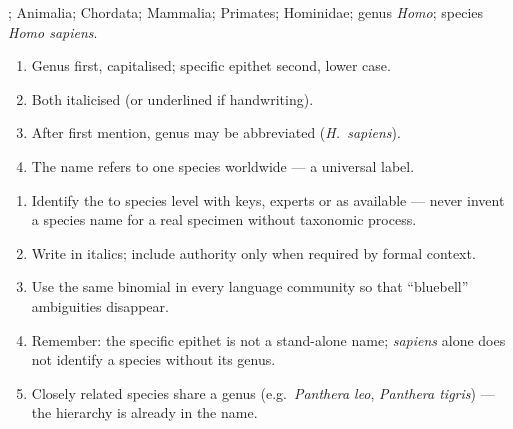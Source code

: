 \begin{example}\label{ex:g10:biodiversity-classification:human}
 ;  Animalia;  Chordata;  Mammalia; 
Primates;  Hominidae; genus \emph{Homo}; species \emph{Homo
sapiens}.
\end{example}

\begin{method}\label{met:g10:biodiversity-classification:name}
\begin{enumerate}
  \item Genus first, capitalised; specific epithet second, lower case.
  \item Both italicised (or underlined if handwriting).
  \item After first mention, genus may be abbreviated (\emph{H.\ sapiens}).
  \item The name refers to one species worldwide --- a universal label.
\end{enumerate}
\end{method}

\begin{method}
\label{met:g10:biodiversity-classification:binomial}
\begin{enumerate}
  \item Identify the  to species level with keys, experts or  as
        available --- never invent a species name for a real specimen without
        taxonomic process.
  \item Write \emph{} in italics; include authority only when
        required by formal context.
  \item Use the same binomial in every language community so that
        ``bluebell'' ambiguities disappear.
  \item Remember: the specific epithet is not a stand-alone name; \emph{sapiens}
        alone does not identify a species without its genus.
  \item Closely related species share a genus (e.g.\ \emph{Panthera leo},
        \emph{Panthera tigris}) --- the hierarchy is already in the name.
\end{enumerate}
\end{method}

